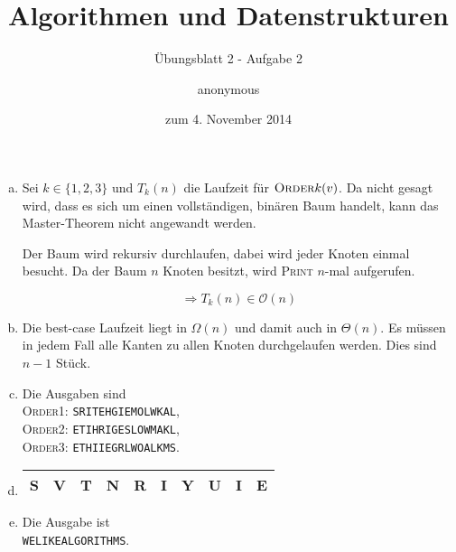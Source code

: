 \documentclass[a4paper]{scrartcl}
\title{Algorithmen und Datenstrukturen}
\subtitle{Übungsblatt 2 - Aufgabe 2}
\author{
    anonymous
}
\date{zum 4. November 2014}
\begin{document}
\maketitle

\begin{enumerate}[(a)]
    \item Sei $k \in \{ 1,2,3 \}$ und $T_k(n)$ die Laufzeit für
        $\textsc{Order}k(v)$.
        Da nicht gesagt wird, dass es sich um einen vollständigen, binären Baum
        handelt, kann das Master-Theorem nicht angewandt werden.
        
        Der Baum wird rekursiv durchlaufen, dabei wird jeder Knoten einmal
        besucht. Da der Baum $n$ Knoten besitzt, wird \textsc{Print} $n$-mal
        aufgerufen.

        \begin{equation}
            \Rightarrow T_k(n) \in \mathcal{O} \left( n \right)
        \end{equation}
        

    \item Die best-case Laufzeit liegt in $\Omega \left( n \right)$ und damit
        auch in $\Theta \left( n \right)$.
        Es müssen in jedem Fall alle Kanten zu allen Knoten durchgelaufen
        werden. Dies sind $n-1$ Stück.

    \item Die Ausgaben sind \\
        \textsc{Order1}: \texttt{SRITEHGIEMOLWKAL}, \\
        \textsc{Order2}: \texttt{ETIHRIGESLOWMAKL}, \\
        \textsc{Order3}: \texttt{ETHIIEGRLWOALKMS}.

    \item
        \begin{tabular}{|c|c|c|c|c|c|c|c|c|c|}
            \hline
            S & V & T & N & R & I & Y & U & I & E \\
            \hline
        \end{tabular}

    \item Die Ausgabe ist \\
        \texttt{WELIKEALGORITHMS}.

\end{enumerate}
\end{document}

